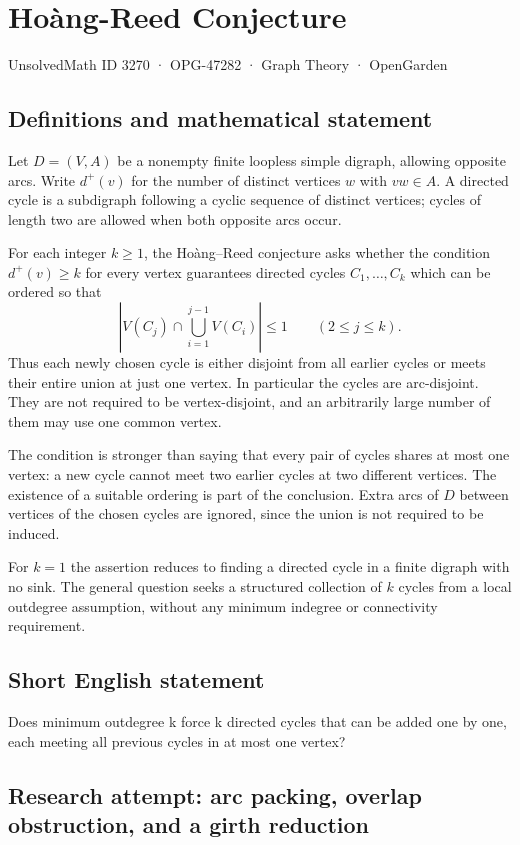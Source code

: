 \documentclass[11pt,a4paper]{article}
\begin{document}
\section*{Hoàng-Reed Conjecture}\label{3270}
{\small UnsolvedMath ID 3270 · OPG-47282 · Graph Theory · OpenGarden}
\subsection{Definitions and mathematical statement}
Let $D=(V,A)$ be a nonempty finite loopless simple digraph, allowing opposite
arcs. Write $d^+(v)$ for the number of distinct vertices $w$ with
$vw\in A$. A directed cycle is a subdigraph following a cyclic sequence
of distinct vertices; cycles of length two are allowed when both
opposite arcs occur.

For each integer $k\ge1$, the Hoàng--Reed conjecture asks whether the
condition $d^+(v)\ge k$ for every vertex guarantees directed cycles
$C_1,\ldots,C_k$ which can be ordered so that
\[
 \left|V(C_j)\cap\bigcup_{i=1}^{j-1}V(C_i)\right|\le1
                         \qquad(2\le j\le k).
\]
Thus each newly chosen cycle is either disjoint from all earlier cycles
or meets their entire union at just one vertex. In particular the
cycles are arc-disjoint. They are not required to be vertex-disjoint,
and an arbitrarily large number of them may use one common vertex.

The condition is stronger than saying that every pair of cycles shares
at most one vertex: a new cycle cannot meet two earlier cycles at two
different vertices. The existence of a suitable ordering is part of
the conclusion. Extra arcs of $D$ between vertices of the chosen cycles
are ignored, since the union is not required to be induced.

For $k=1$ the assertion reduces to finding a directed cycle in a finite
digraph with no sink. The general question seeks a structured collection
of $k$ cycles from a local outdegree assumption, without any minimum
indegree or connectivity requirement.
\subsection{Short English statement}
Does minimum outdegree k force k directed cycles that can be added one by one, each meeting all previous cycles in at most one vertex?
\subsection{Research attempt: arc packing, overlap obstruction, and a girth reduction}
\end{document}
